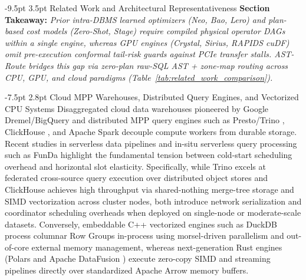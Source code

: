 \documentclass[10pt,a4paper]{article}
\makeatletter
\renewcommand\section{\@startsection{section}{1}{\z@}%
  {-9.5pt \@plus -2pt \@minus -1.5pt}%
  {3.5pt \@plus 1pt}%
  {\normalfont\large\bfseries}}
\renewcommand\subsection{\@startsection{subsection}{2}{\z@}%
  {-7.5pt \@plus -2pt \@minus -1pt}%
  {2.8pt \@plus 1pt}%
  {\normalfont\normalsize\bfseries}}
\makeatother
\begin{document}
\section{Related Work and Architectural Representativeness}
\noindent\textbf{Section Takeaway:} \emph{Prior intra-DBMS learned optimizers (Neo, Bao, Lero) and plan-based cost models (Zero-Shot, Stage) require compiled physical operator DAGs within a single engine, whereas GPU engines (Crystal, Sirius, RAPIDS cuDF) omit pre-execution conformal tail-risk guards against PCIe transfer stalls. AST-Route bridges this gap via zero-plan raw-SQL AST + zone-map routing across CPU, GPU, and cloud paradigms (Table~\ref{tab:related_work_comparison}).}\par\vspace{2pt}
\subsection{Cloud MPP Warehouses, Distributed Query Engines, and Vectorized CPU Systems}
Disaggregated cloud data warehouses pioneered by Google Dremel/BigQuery \cite{melnik2010dremel, melnik2020dremel} and distributed MPP query engines such as Presto/Trino \cite{sethi2019presto}, ClickHouse \cite{schulze2024clickhouse}, and Apache Spark \cite{ahmed2020hibench} decouple compute workers from durable storage. Recent studies in serverless data pipelines \cite{shojaee2024serverless} and in-situ serverless query processing such as FunDa \cite{lounissi2025funda} highlight the fundamental tension between cold-start scheduling overhead and horizontal slot elasticity. Specifically, while Trino \cite{sethi2019presto} excels at federated cross-source query execution over distributed object stores and ClickHouse \cite{schulze2024clickhouse} achieves high throughput via shared-nothing merge-tree storage and SIMD vectorization across cluster nodes, both introduce network serialization and coordinator scheduling overheads when deployed on single-node or moderate-scale datasets. Conversely, embeddable C++ vectorized engines such as DuckDB \cite{raasveldt2019duckdb, kuiper2024duckdb_ooc} process columnar Row Groups in-process using morsel-driven parallelism and out-of-core external memory management, whereas next-generation Rust engines (Polars and Apache DataFusion \cite{lamb2024datafusion}) execute zero-copy SIMD and streaming pipelines directly over standardized Apache Arrow memory buffers.
\end{document}
